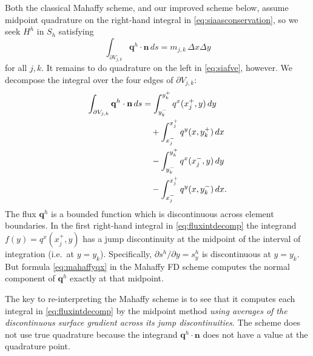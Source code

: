 \documentclass[review,letterpaper]{igs}
\newcommand\bn{\mathbf{n}}
\newcommand\bq{\mathbf{q}}
\begin{document}
Both the classical Mahaffy scheme, and our improved scheme below, assume midpoint quadrature on the right-hand integral in \eqref{eq:siaasconservation}, so we seek $H^h$ in $S_h$ satisfying
\begin{equation}
  \int_{\partial V_{j,k}} \bq^h \cdot \bn\,ds = m_{j,k}\, \Delta x \Delta y \label{eq:siafve}
\end{equation}
for all $j,k$.  It remains to do quadrature on the left in \eqref{eq:siafve}, however.  We decompose the integral over the four edges of $\partial V_{j,k}$:
\begin{align}
\int_{\partial V_{j,k}} \bq^h \cdot \bn\,ds &= \int_{y_k^-}^{y_k^+} q^x(x_j^+,y)\,dy \label{eq:fluxintdecomp} \\
&\quad + \int_{x_j^-}^{x_j^+} q^y(x,y_k^+)\,dx \notag \\
&\quad - \int_{y_k^-}^{y_k^+} q^x(x_j^-,y)\,dy \notag \\
&\quad - \int_{x_j^-}^{x_j^+} q^y(x,y_k^-)\,dx. \notag
\end{align}
The flux $\bq^h$ is a bounded function which is discontinuous across element boundaries.  In the first right-hand integral in \eqref{eq:fluxintdecomp} the integrand $f(y) = q^x(x_j^+,y)$ has a jump discontinuity at the midpoint of the interval of integration (i.e.~at $y=y_k$).  Specifically, $\partial s^h/\partial y = s^h_y$ is discontinuous at $y=y_k$.  But formula \eqref{eq:mahaffyqx} in the Mahaffy FD scheme computes the normal component of $\bq^h$ exactly at that midpoint.

The key to re-interpreting the Mahaffy scheme is to see that it computes each integral in \eqref{eq:fluxintdecomp} by the midpoint method \emph{using averages of the discontinuous surface gradient across its jump discontinuities}.  The scheme does not use true quadrature because the integrand $\bq^h\cdot \bn$ does not have a value at the quadrature point.
\end{document}

